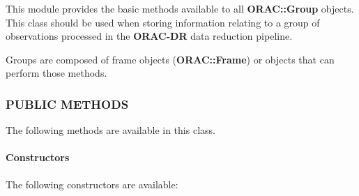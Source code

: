 This module provides the basic methods available to all
\textbf{ORAC::Group} objects. This class should be used when
storing information relating to a group of observations
processed in the \textbf{ORAC-DR} data reduction pipeline.



Groups are composed of frame objects (\textbf{ORAC::Frame})
or objects that can perform those methods.

\subsubsection*{PUBLIC METHODS\label{ORAC::Group_PUBLIC_METHODS}}


The following methods are available in this class.

\paragraph*{Constructors\label{ORAC::Group_Constructors}}


The following constructors are available:

